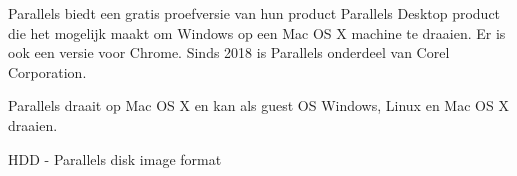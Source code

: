 Parallels biedt een gratis proefversie van hun product Parallels Desktop product die het mogelijk maakt om Windows op een Mac OS X machine te draaien. Er is ook een versie voor Chrome. Sinds 2018 is Parallels onderdeel van Corel Corporation.

Parallels draait op Mac OS X en kan als guest OS Windows, Linux en Mac OS X draaien.

HDD - Parallels disk image format
